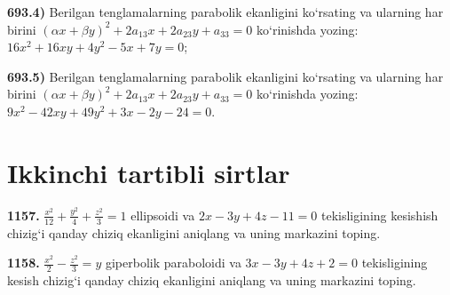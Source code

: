 \textbf{693.4)} Berilgan tenglamalarning parabolik ekanligini ko‘rsating va ularning har birini $(\alpha x+\beta y)^2+2 a_{13} x+2 a_{23} y+a_{33}=0$ ko‘rinishda yozing: $16 x^2+16 x y+4 y^2-5 x+7 y=0$;

\textbf{693.5)} Berilgan tenglamalarning parabolik ekanligini ko‘rsating va ularning har birini $(\alpha x+\beta y)^2+2 a_{13} x+2 a_{23} y+a_{33}=0$ ko‘rinishda yozing: $9 x^2-42 x y+49 y^2+3 x-2 y-24=0$.



\section{Ikkinchi tartibli sirtlar}



\textbf{1157.} $\frac{x^2}{12}+\frac{y^2}{4}+\frac{z^2}{3}=1$ ellipsoidi va $2x-3y+4z-11=0$ tekisligining kesishish chizig‘i qanday chiziq ekanligini aniqlang va uning markazini toping.

\textbf{1158.} $\frac{x^2}{2}-\frac{z^2}{3}=y$ giperbolik paraboloidi va $3x-3y+4z+2=0$ tekisligining kesish chizig‘i qanday chiziq ekanligini aniqlang va uning markazini toping.